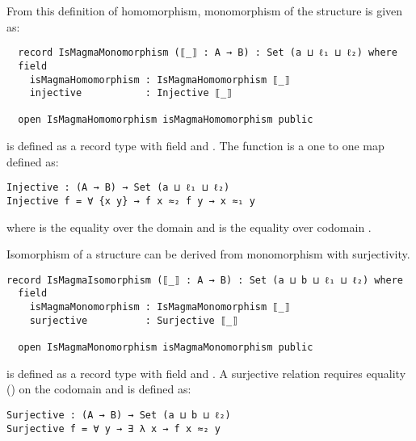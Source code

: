 From this definition of homomorphism, monomorphism of the structure is given as:

\begin{verbatim}
  record IsMagmaMonomorphism (⟦_⟧ : A → B) : Set (a ⊔ ℓ₁ ⊔ ℓ₂) where
  field
    isMagmaHomomorphism : IsMagmaHomomorphism ⟦_⟧
    injective           : Injective ⟦_⟧

  open IsMagmaHomomorphism isMagmaHomomorphism public
\end{verbatim}
 is defined as a record type with field
 and . The 
function is a one to one map defined as:
\begin{verbatim}
Injective : (A → B) → Set (a ⊔ ℓ₁ ⊔ ℓ₂)
Injective f = ∀ {x y} → f x ≈₂ f y → x ≈₁ y
\end{verbatim}
where  is the equality over the domain  and 
is the equality over codomain .

Isomorphism of a structure can be derived from monomorphism with surjectivity.
\begin{verbatim}
record IsMagmaIsomorphism (⟦_⟧ : A → B) : Set (a ⊔ b ⊔ ℓ₁ ⊔ ℓ₂) where
  field
    isMagmaMonomorphism : IsMagmaMonomorphism ⟦_⟧
    surjective          : Surjective ⟦_⟧

  open IsMagmaMonomorphism isMagmaMonomorphism public
\end{verbatim} 
 is defined as a record type with field
 and . A surjective relation
requires equality () on the codomain  and is defined as:
\begin{verbatim}
Surjective : (A → B) → Set (a ⊔ b ⊔ ℓ₂)
Surjective f = ∀ y → ∃ λ x → f x ≈₂ y
\end{verbatim}

